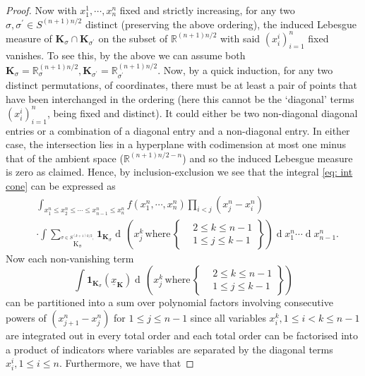 \documentclass[11pt, reqno]{amsart}
\numberwithin{equation}{section}
\newcommand{\R}{\ensuremath{\mathbb{R}}}
\newcommand{\diff}{\ensuremath{\operatorname{d}\!}}
\begin{document}
\begin{proof}
Now with $x^1_1, \cdots, x^n_n$ fixed and strictly increasing, for any two $\sigma, \sigma^\prime \in S^{(n+1)n/2}$ distinct (preserving the above ordering), the induced Lebesgue measure of $\boldsymbol{K}_{\sigma}\cap \boldsymbol{K}_{\sigma^\prime}$ on the subset of $\R^{(n+1)n/2}$ with said $(x^i_i)_{i=1}^n$ fixed vanishes. To see this, by the above we can assume both $\boldsymbol{K}_{\sigma} = \R^{(n+1)n/2}_{\sigma}, \boldsymbol{K}_{\sigma^{\prime}} = \R^{(n+1)n/2}_{\sigma^\prime}$. Now, by a quick induction, for any two distinct permutations, of coordinates, there must be at least a pair of points that have been interchanged in the ordering (here this cannot be the `diagonal' terms $(x^i_i)_{i=1}^n$, being fixed and distinct). It could either be two non-diagonal diagonal entries or a combination of a diagonal entry and a non-diagonal entry. In either case, the intersection lies in a hyperplane with codimension at most one minus that of the ambient space ($\R^{(n+1)n/2-n}$) and so the induced Lebesgue measure is zero as claimed.  Hence, by inclusion-exclusion we see that the integral \ref{eq: int cone} can be expressed as
\begin{equation*}
\begin{array}{cc}
     &\displaystyle\int_{x^n_1\le x^n_2\le \cdots\le x^n_{n-1}\le x^n_n}f (x^n_1, \cdots, x^n_n)\displaystyle\prod_{i<j} (x^n_j-x^n_i) \\
     & \cdot\displaystyle\int \displaystyle\sum_{\stackrel{\sigma\in S^{(k+1)k/2},}{\mathrm{K_{\sigma}}}}\mathbf{1}_{\boldsymbol{K}_{\sigma}}\diff\, \left(x^k_j\, \mathrm{where}\, \left.\begin{cases}
       &2\le k \le n-1\\
       &1\le j \le k-1
   \end{cases}\right\} \right)\diff x^n_1\cdots \diff x^n_{n-1}.
\end{array}
\end{equation*}
Now each non-vanishing term
\begin{equation*}
    \displaystyle\int \mathbf{1}_{\boldsymbol{K}_{\sigma}}(\underline{x}_{\boldsymbol{K}})\diff\, \left(x^k_j\, \mathrm{where}\, \left.\begin{cases}
       &2\le k \le n-1\\
       &1\le j \le k-1
   \end{cases}\right\} \right)
\end{equation*}
can be partitioned into a sum over polynomial factors involving consecutive powers of $(x^n_{j+1}-x^n_j)$ for $1\le j \le n-1$ since all variables $x^k_i, 1\le i < k\le n-1$ are integrated out in every total order and each total order can be factorised into a product of indicators where variables are separated by the diagonal terms $x^i_i, 1\le i \le n $. Furthermore, we have that

\end{proof}
\end{document}
